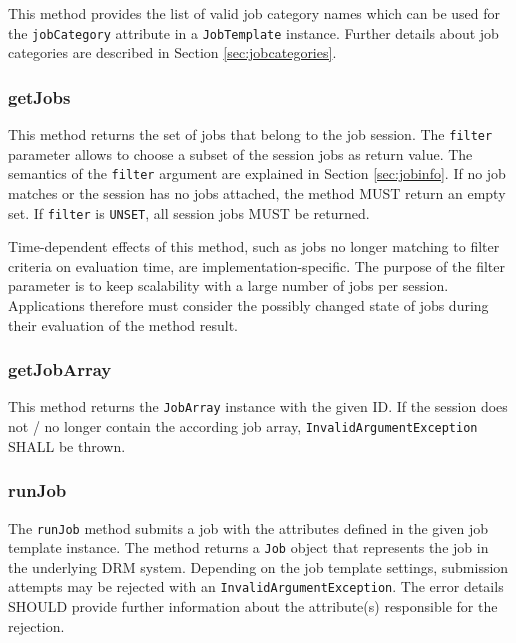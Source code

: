 \documentclass{article}
\newcommand{\h}[1]{\lstinline|#1|}
\newcommand{\rat}[1]{}
\begin{document}
This method provides the list of valid job category names which can be used for the \h{jobCategory} attribute in a \h{JobTemplate} instance. Further details about job categories are described in Section \ref{sec:jobcategories}.

\subsubsection{getJobs}

This method returns the set of jobs that belong to the job session. The \h{filter} parameter allows to choose a subset of the session jobs as return value. The semantics of the \h{filter} argument are explained in Section \ref{sec:jobinfo}. If no job matches or the session has no jobs attached, the method MUST return an empty set. If \h{filter} is \h{UNSET}, all session jobs MUST be returned.

Time-dependent effects of this method, such as jobs no longer matching to filter criteria on evaluation time, are implementation-specific. The purpose of the filter parameter is to keep scalability with a large number of jobs per session. Applications therefore must consider the possibly changed state of jobs during their evaluation of the method result.

\rat{We are aware of the fact that the automated reaping of terminated jobs in some DRM systems might change this methods result. However, there was no way to demand some standardized behavior for that.}

\subsubsection{getJobArray}

This method returns the \h{JobArray} instance with the given ID. If the session does not / no longer contain the according job array, \h{InvalidArgumentException} SHALL be thrown.

\rat {
June 2011 conf. call decided to not support JobArray filtering in the session at this point. The face-to-face meeting in June 2011 identified that DRM systems typically do not support the identification of bulk jobs in the system, so it would be hard to implement the according reporting function.
}

\subsubsection{runJob}

The \h{runJob} method submits a job with the attributes defined in the given job template instance. The method returns a \h{Job} object that represents the job in the underlying DRM system. Depending on the job template settings, submission attempts may be rejected with an \h{InvalidArgumentException}. The error details SHOULD provide further information about the attribute(s) responsible for the rejection.
\end{document}
